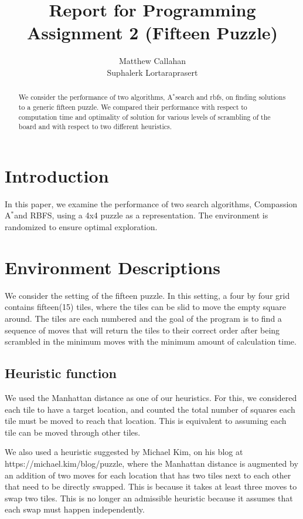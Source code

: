 \documentclass{article}
\title{Report for Programming Assignment 2 (Fifteen Puzzle)}
\author{%
  Matthew Callahan\\
  \And
  Suphalerk Lortaraprasert
}
\begin{document}
\maketitle


\begin{abstract}
 We consider the performance of two algorithms, A$^*$search and rbfs, on finding solutions to a generic fifteen puzzle. We compared their performance with respect to computation time and optimality of solution for various levels of scrambling of the board and with respect to two different heuristics. 
\end{abstract}

\section{Introduction}

In this paper, we examine the performance of two search algorithms, Compassion A$^*$and RBFS, using a 4x4 puzzle as a representation. The environment is randomized to ensure optimal exploration. 

\section{Environment Descriptions}
We consider the setting of the fifteen puzzle. In this setting, a four by four grid contains fifteen(15) tiles, where the tiles can be slid to move the empty square around. The tiles are each numbered and the goal of the program is to find a sequence of moves that will return the tiles to their correct order after being scrambled in the minimum moves with the minimum amount of calculation time. 

\subsection{Heuristic function}
We used the Manhattan distance as one of our heuristics. For this, we considered each tile to have a target location, and counted the total number of squares each tile must be moved to reach that location. This is equivalent to assuming each tile can be moved through other tiles.

We also used a heuristic suggested by Michael Kim, on his blog at https://michael.kim/blog/puzzle, where the Manhattan distance is augmented by an addition of two moves for each location that has two tiles next to each other that need to be directly swapped. This is because it takes at least three moves to swap two tiles. This is no longer an admissible heuristic because it assumes that each swap must happen independently. 
\end{document}
